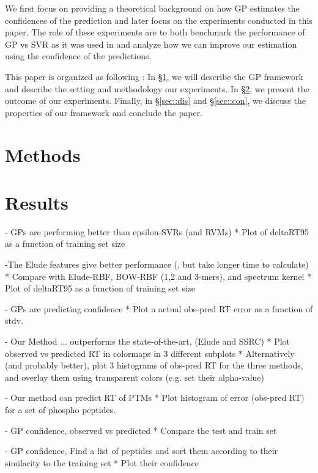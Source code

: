 \documentclass{bioinfo}
\begin{document}
We first focus on providing a theoretical background on how GP estimates the confidences of the prediction and later focus on the experiments conducted in this paper. The role of these experiments are to both benchmark the performance of GP vs SVR as it was used in \cite{elude} and analyze how we can improve our estimation using the confidence of the predictions.

This paper is organized as following : In \S\ref{sec::method}, we will describe the GP framework and describe the setting and methodology our experiments. In \S\ref{sec::results}, we present the outcome of our experiments. Finally, in \S\ref{sec::dis} and \S\ref{sec::con}, we discuss the properties of our framework and conclude the paper.
\begin{methods}
\section{Methods}
\label{sec::method}


\section{Results}
\label{sec::results}

- GPs are performing better than epsilon-SVRs (and RVMs)
* Plot of deltaRT95 as a function of training set size

-The Elude features give better performance (, but take longer time to calculate)
* Compare with Elude-RBF, BOW-RBF (1,2 and 3-mers), and spectrum kernel
* Plot of deltaRT95 as a function of training set size

- GPs are predicting confidence
* Plot a actual obs-pred RT error as a function of stdv.

- Our Method ... outperforms the state-of-the-art, (Elude and SSRC) 
* Plot observed vs predicted RT in colormaps in 3 different subplots
* Alternatively (and probably better), plot 3 histograms of obs-pred RT for the three methods, and overlay them using transparent colors (e.g. set their alpha-value)

- Our method can predict RT of PTMs
* Plot histogram of error (obs-pred RT) for a set of phospho peptides. 

- GP confidence, observed vs predicted
* Compare the test and train set

- GP confidence, Find a list of peptides and sort them according to their similarity to the training set
* Plot their confidence 




\end{methods}
\end{document}
